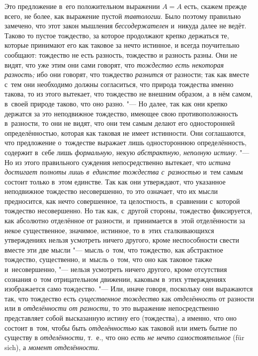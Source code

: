 Это предложение в~его положительном выражении $A=A$ есть,
скажем прежде всего, не более, как выражение пустой
{\em тавтологии}. Было поэтому правильно замечено, что
этот закон мышления {\em бессодержателен} и~никуда
далее не ведёт. Таково то пустое тождество, за которое продолжают крепко
держаться те, которые принимают его как таковое за нечто истинное, и
всегда поучительно сообщают: тождество не есть разность, тождество и
разность разны. Они не видят, что уже этим они сами говорят, что
{\em тождество есть некоторая разность;} ибо они
говорят, что тождество {\em разнится} от разности; так
как вместе с~тем они необходимо должны согласиться, что природа тождества
именно такова, то из этого вытекает, что тождество не внешним образом, а~в
нём самом, в~своей природе таково, что оно разно. "--- Но далее, так как они
крепко держатся за это неподвижное тождество, имеющее свою
противоположность в~разности, то они не видят, что они тем самым делают его
односторонней определённостью, которая как таковая не имеет истинности.
Они соглашаются, что предложение о~тождестве выражает лишь одностороннюю
определённость, содержит в~себе лишь {\em формальную,}
некую {\em абстрактную,}
{\em неполную истину}. "--- Но из этого правильного
суждения непосредственно вытекает, что {\em истина
достигает полноты лишь в~единстве тождества с~разностью} и~тем самым
состоит только в~этом единстве. Так как они утверждают, что указанное
неподвижное тождество несовершенно, то это означает, что их мысли
предносится, как нечто совершенное, та целостность, в~сравнении с~которой
тождество несовершенно. Но так как, с~другой стороны, тождество
фиксируется, как абсолютно отделённое от разности, и~принимается в~этой
отделённости за некое существенное, значимое, истинное, то в~этих
сталкивающихся утверждениях нельзя усмотреть ничего другого, кроме
неспособности свести вместе эти две мысли "--- мысль о~том, что тождество, как
абстрактное тождество, существенно, и~мысль о~том, что оно как таковое
также и~несовершенно, "--- нельзя усмотреть ничего другого, кроме отсутствия
сознания о~том отрицательном движении, каковым в~этих утверждениях
изображается само тождество. "--- Или, иначе говоря, поскольку они выражаются
так, что тождество есть {\em существенное тождество}
как {\em отделённость} от разности или в
{\em отделённости от разности,} то это выражение
непосредственно представляет собой высказанную истину его (тождества), а
именно, что оно состоит в~том, чтобы быть
{\em отделённостью} как таковой или иметь бытие по
существу в {\em отделённости,} т.~е., что оно
{\em есть не нечто самостоятельное} (für sich), а
{\em момент отделённости}.

